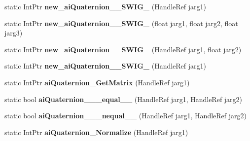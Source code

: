 \begin{DoxyCompactItemize}
\item 
\hypertarget{class_assimp_p_i_n_v_o_k_e_a55674f2b0ad0b389ce596db78c8e7488}{static Int\+Ptr {\bfseries new\+\_\+ai\+Quaternion\+\_\+\+\_\+\+S\+W\+I\+G\+\_} (Handle\+Ref jarg1)}\label{class_assimp_p_i_n_v_o_k_e_a55674f2b0ad0b389ce596db78c8e7488}

\item 
\hypertarget{class_assimp_p_i_n_v_o_k_e_a0da27b18e3ace32149e4df7f28e077a2}{static Int\+Ptr {\bfseries new\+\_\+ai\+Quaternion\+\_\+\+\_\+\+S\+W\+I\+G\+\_} (float jarg1, float jarg2, float jarg3)}\label{class_assimp_p_i_n_v_o_k_e_a0da27b18e3ace32149e4df7f28e077a2}

\item 
\hypertarget{class_assimp_p_i_n_v_o_k_e_a598a161a9e7b065dd6b25813dc8dd30c}{static Int\+Ptr {\bfseries new\+\_\+ai\+Quaternion\+\_\+\+\_\+\+S\+W\+I\+G\+\_} (Handle\+Ref jarg1, float jarg2)}\label{class_assimp_p_i_n_v_o_k_e_a598a161a9e7b065dd6b25813dc8dd30c}

\item 
\hypertarget{class_assimp_p_i_n_v_o_k_e_a7bae6d081ce8889b53e3ab382129b5a1}{static Int\+Ptr {\bfseries new\+\_\+ai\+Quaternion\+\_\+\+\_\+\+S\+W\+I\+G\+\_} (Handle\+Ref jarg1)}\label{class_assimp_p_i_n_v_o_k_e_a7bae6d081ce8889b53e3ab382129b5a1}

\item 
\hypertarget{class_assimp_p_i_n_v_o_k_e_a1332c403d1d68a0bd9712e1f22b41efd}{static Int\+Ptr {\bfseries ai\+Quaternion\+\_\+\+Get\+Matrix} (Handle\+Ref jarg1)}\label{class_assimp_p_i_n_v_o_k_e_a1332c403d1d68a0bd9712e1f22b41efd}

\item 
\hypertarget{class_assimp_p_i_n_v_o_k_e_a32b20ab968974b173845446e9da89aa2}{static bool {\bfseries ai\+Quaternion\+\_\+\+\_\+\+\_\+equal\+\_\+\+\_\+} (Handle\+Ref jarg1, Handle\+Ref jarg2)}\label{class_assimp_p_i_n_v_o_k_e_a32b20ab968974b173845446e9da89aa2}

\item 
\hypertarget{class_assimp_p_i_n_v_o_k_e_ad63aa705712f2c536beb0c0afc4181bf}{static bool {\bfseries ai\+Quaternion\+\_\+\+\_\+\+\_\+nequal\+\_\+\+\_\+} (Handle\+Ref jarg1, Handle\+Ref jarg2)}\label{class_assimp_p_i_n_v_o_k_e_ad63aa705712f2c536beb0c0afc4181bf}

\item 
\hypertarget{class_assimp_p_i_n_v_o_k_e_a2ff122b169edb66615ee22ddbb397828}{static Int\+Ptr {\bfseries ai\+Quaternion\+\_\+\+Normalize} (Handle\+Ref jarg1)}\label{class_assimp_p_i_n_v_o_k_e_a2ff122b169edb66615ee22ddbb397828}


\end{DoxyCompactItemize}
